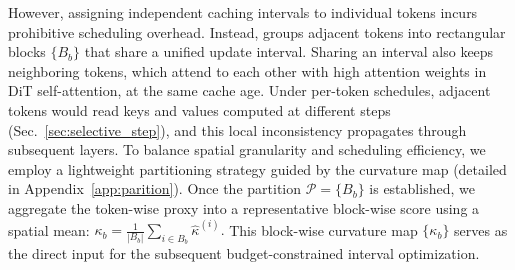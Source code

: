


However, assigning independent caching intervals to individual tokens incurs prohibitive scheduling overhead. Instead, \cubic groups adjacent tokens into rectangular blocks $\{B_b\}$ that share a unified update interval. Sharing an interval also keeps neighboring tokens, which attend to each other with high attention weights in DiT self-attention, at the same cache age. Under per-token schedules, adjacent tokens would read keys and values computed at different steps (Sec.~\ref{sec:selective_step}), and this local inconsistency propagates through subsequent layers. To balance spatial granularity and scheduling efficiency, we employ a lightweight partitioning strategy guided by the curvature map (detailed in Appendix~\ref{app:parition}). Once the partition $\mathcal{P}=\{B_b\}$ is established, we aggregate the token-wise proxy into a representative block-wise score using a spatial mean:
    $\kappa_b = \frac{1}{|B_b|} \sum_{i \in B_b} \hat{\kappa}^{(i)}.$
This block-wise curvature map $\{\kappa_b\}$ serves as the direct input for the subsequent budget-constrained interval optimization.

